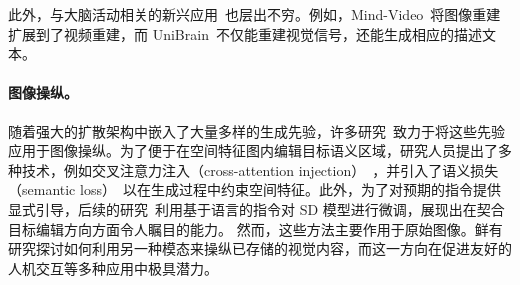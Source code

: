 此外，与大脑活动相关的新兴应用~\cite{sun2023tuning,sun2024neurocine,wang2024mindbridge,nikolaus2024modality,xia2024umbrae,chen2024bridging,huo2024neuropictor}也层出不穷。例如，Mind-Video~\cite{chen2023cinematic}将图像重建扩展到了视频重建，而 UniBrain~\cite{mai2023unibrain}不仅能重建视觉信号，还能生成相应的描述文本。

\paragraph{图像操纵。}
随着强大的扩散架构中嵌入了大量多样的生成先验，许多研究~\cite{avrahami2023blended,couairon2022diffedit,meng2021sdedit,nichol2021glide,sun2023imagebrush,sun2024avi}致力于将这些先验应用于图像操纵。为了便于在空间特征图内编辑目标语义区域，研究人员提出了多种技术，例如交叉注意力注入（cross-attention injection）~\cite{hertz2022prompt,balaji2022ediffi}，并引入了语义损失（semantic loss）~\cite{tumanyan2023plug}以在生成过程中约束空间特征。此外，为了对预期的指令提供显式引导，后续的研究~\cite{brooks2023instructpix2pix,geng2023instructdiffusion}利用基于语言的指令对 SD 模型进行微调，展现出在契合目标编辑方向方面令人瞩目的能力。
然而，这些方法主要作用于原始图像。鲜有研究探讨如何利用另一种模态来操纵已存储的视觉内容，而这一方向在促进友好的人机交互等多种应用中极具潜力。

